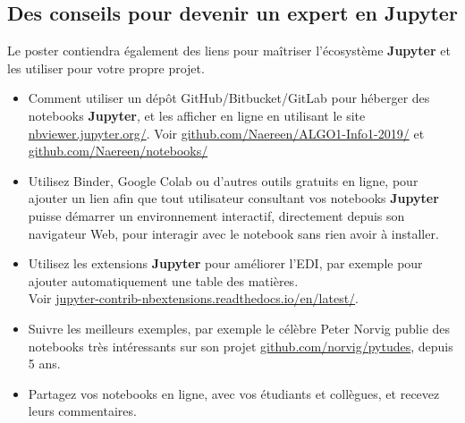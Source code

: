 \documentclass[runningheads]{llncs}
\newcommand{\Jupyter}{\textbf{Jupyter}}
\begin{document}


\subsection*{Des conseils pour devenir un expert en \Jupyter}

Le poster contiendra également des liens pour maîtriser l'écosystème \Jupyter{} et les utiliser pour votre propre projet.

\begin{itemize}
    \item Comment utiliser un dépôt GitHub/Bitbucket/GitLab pour héberger des notebooks \Jupyter{}, et les afficher en ligne en utilisant le site \url{nbviewer.jupyter.org/}.
    Voir \url{github.com/Naereen/ALGO1-Info1-2019/} et \url{github.com/Naereen/notebooks/}
    \item Utilisez Binder, Google Colab ou d'autres outils gratuits en ligne, pour ajouter un lien afin que tout utilisateur consultant vos notebooks \Jupyter{} puisse démarrer un environnement interactif, directement depuis son navigateur Web, pour interagir avec le notebook sans rien avoir à installer.
    \item Utilisez les extensions \Jupyter{} pour améliorer l'EDI, par exemple pour ajouter automatiquement une table des matières. \\
    Voir \url{jupyter-contrib-nbextensions.readthedocs.io/en/latest/}.
    \item Suivre les meilleurs exemples, par exemple le célèbre Peter Norvig publie des notebooks très intéressants sur son projet \url{github.com/norvig/pytudes}, depuis 5 ans.
    \item Partagez vos notebooks en ligne, avec vos étudiants et collègues, et recevez leurs commentaires.
\end{itemize}
\end{document}
